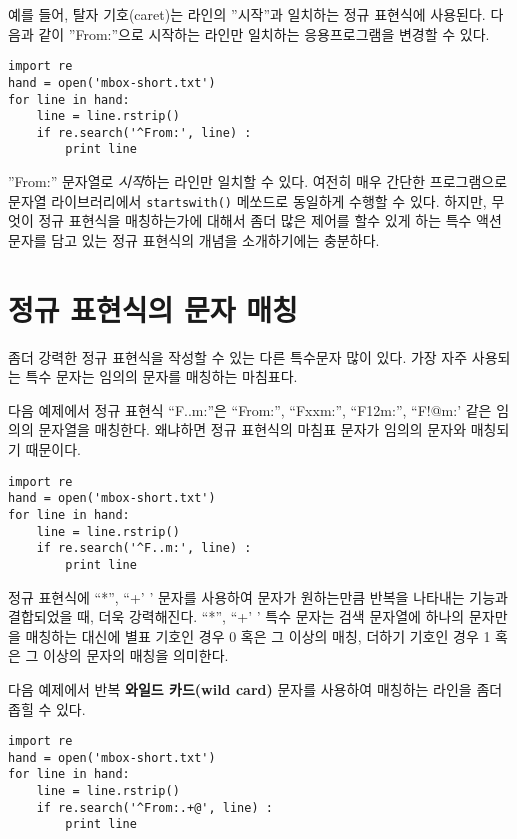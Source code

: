 예를 들어, 탈자 기호(caret)는 라인의 ''시작''과 일치하는 정규 표현식에 사용된다.
다음과 같이 ''From:''으로 시작하는 라인만 일치하는 응용프로그램을 변경할 수 있다.

\beforeverb
\begin{verbatim}
import re
hand = open('mbox-short.txt')
for line in hand:
    line = line.rstrip()
    if re.search('^From:', line) :
        print line
\end{verbatim}
\afterverb
%

''From:'' 문자열로 {\em 시작}하는 라인만 일치할 수 있다. 여전히 매우 간단한 프로그램으로 문자열 라이브러리에서  {\tt startswith()} 메쏘드로 동일하게 수행할 수 있다.
하지만, 무엇이 정규 표현식을 매칭하는가에 대해서 좀더 많은 제어를 할수 있게 하는 특수 액션 문자를 담고 있는 정규 표현식의 개념을 소개하기에는 충분하다.


\section{정규 표현식의 문자 매칭}

좀더 강력한 정규 표현식을 작성할 수 있는 다른 특수문자 많이 있다.
가장 자주 사용되는 특수 문자는 임의의 문자를 매칭하는 마침표다.


다음 예제에서 정규 표현식 ``F..m:''은 ``From:'', ``Fxxm:'', ``F12m:'', ``F!@m:' 같은 임의의 문자열을 매칭한다. 왜냐하면 정규 표현식의 마침표 문자가 임의의 문자와 매칭되기 때문이다.

\beforeverb
\begin{verbatim}
import re
hand = open('mbox-short.txt')
for line in hand:
    line = line.rstrip()
    if re.search('^F..m:', line) :
        print line
\end{verbatim}
\afterverb
%

정규 표현식에 ``*'', ``+' ' 문자를 사용하여 문자가 원하는만큼 반복을 나타내는 기능과 결합되었을 때, 더욱 강력해진다.
``*'', ``+' ' 특수 문자는 검색 문자열에 하나의 문자만을 매칭하는 대신에 별표 기호인 경우 0 혹은 그 이상의 매칭, 더하기 기호인 경우 1 혹은 그 이상의 문자의 매칭을 의미한다.

다음 예제에서 반복 {\bf 와일드 카드(wild card)} 문자를 사용하여 매칭하는 라인을 좀더 좁힐 수 있다.

\beforeverb
\begin{verbatim}
import re
hand = open('mbox-short.txt')
for line in hand:
    line = line.rstrip()
    if re.search('^From:.+@', line) :
        print line
\end{verbatim}
\afterverb
%

